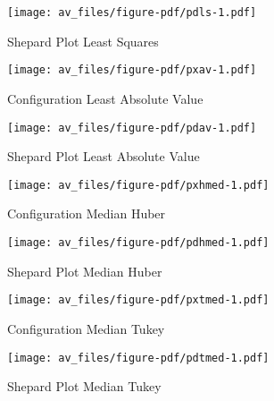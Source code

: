 \documentclass[
  12pt,
  letterpaper,
  DIV=11,
  numbers=noendperiod]{scrartcl}
\begin{document}
\begin{figure}[H]

{\centering \texttt{[image: av\_files/figure-pdf/pdls-1.pdf]}

}

\caption{Shepard Plot Least Squares}

\end{figure}%

\begin{figure}[H]

{\centering \texttt{[image: av\_files/figure-pdf/pxav-1.pdf]}

}

\caption{Configuration Least Absolute Value}

\end{figure}%

\begin{figure}[H]

{\centering \texttt{[image: av\_files/figure-pdf/pdav-1.pdf]}

}

\caption{Shepard Plot Least Absolute Value}

\end{figure}%

\begin{figure}[H]

{\centering \texttt{[image: av\_files/figure-pdf/pxhmed-1.pdf]}

}

\caption{Configuration Median Huber}

\end{figure}%

\begin{figure}[H]

{\centering \texttt{[image: av\_files/figure-pdf/pdhmed-1.pdf]}

}

\caption{Shepard Plot Median Huber}

\end{figure}%

\begin{figure}[H]

{\centering \texttt{[image: av\_files/figure-pdf/pxtmed-1.pdf]}

}

\caption{Configuration Median Tukey}

\end{figure}%

\begin{figure}[H]

{\centering \texttt{[image: av\_files/figure-pdf/pdtmed-1.pdf]}

}

\caption{Shepard Plot Median Tukey}

\end{figure}%
\end{document}

